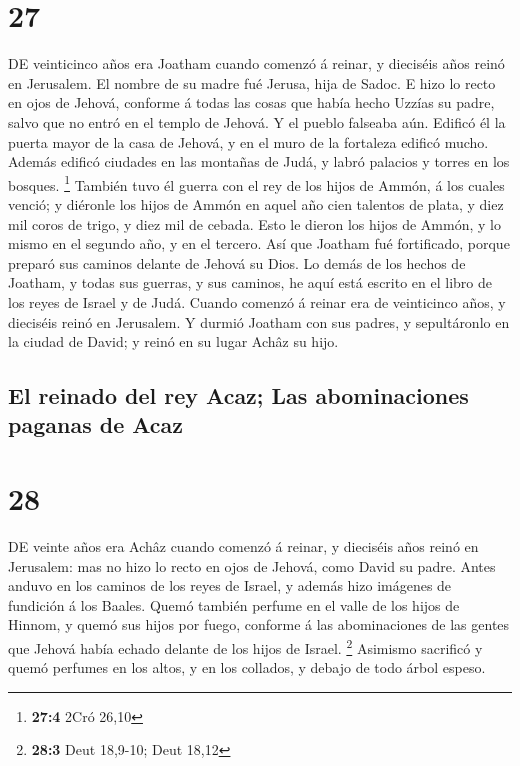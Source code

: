 \hypertarget{section-26}{%
\section{27}\label{section-26}}

 DE veinticinco años era Joatham cuando comenzó á reinar,
y dieciséis años reinó en Jerusalem. El nombre de su madre fué Jerusa,
hija de Sadoc.  E hizo lo recto en ojos de Jehová,
conforme á todas las cosas que había hecho Uzzías su padre, salvo que no
entró en el templo de Jehová. Y el pueblo falseaba aún. 
Edificó él la puerta mayor de la casa de Jehová, y en el muro de la
fortaleza edificó mucho.  Además edificó ciudades en las
montañas de Judá, y labró palacios y torres en los bosques. \footnote{\textbf{27:4}
  2Cró 26,10}  También tuvo él guerra con el rey de los
hijos de Ammón, á los cuales venció; y diéronle los hijos de Ammón en
aquel año cien talentos de plata, y diez mil coros de trigo, y diez mil
de cebada. Esto le dieron los hijos de Ammón, y lo mismo en el segundo
año, y en el tercero.  Así que Joatham fué fortificado,
porque preparó sus caminos delante de Jehová su Dios.  Lo
demás de los hechos de Joatham, y todas sus guerras, y sus caminos, he
aquí está escrito en el libro de los reyes de Israel y de Judá.
 Cuando comenzó á reinar era de veinticinco años, y
dieciséis reinó en Jerusalem.  Y durmió Joatham con sus
padres, y sepultáronlo en la ciudad de David; y reinó en su lugar Achâz
su hijo.

\hypertarget{el-reinado-del-rey-acaz-las-abominaciones-paganas-de-acaz}{%
\subsection{El reinado del rey Acaz; Las abominaciones paganas de
Acaz}\label{el-reinado-del-rey-acaz-las-abominaciones-paganas-de-acaz}}

\hypertarget{section-27}{%
\section{28}\label{section-27}}

 DE veinte años era Achâz cuando comenzó á reinar, y
dieciséis años reinó en Jerusalem: mas no hizo lo recto en ojos de
Jehová, como David su padre.  Antes anduvo en los caminos
de los reyes de Israel, y además hizo imágenes de fundición á los
Baales.  Quemó también perfume en el valle de los hijos de
Hinnom, y quemó sus hijos por fuego, conforme á las abominaciones de las
gentes que Jehová había echado delante de los hijos de Israel.
\footnote{\textbf{28:3} Deut 18,9-10; Deut 18,12} 
Asimismo sacrificó y quemó perfumes en los altos, y en los collados, y
debajo de todo árbol espeso.

